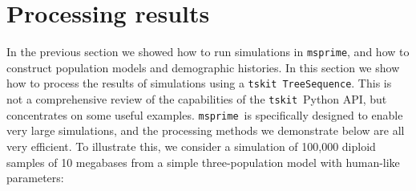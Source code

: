 \documentclass[graybox]{svmult}
\newcommand{\msprime}[0]{\texttt{msprime}}
\newcommand{\tskit}[0]{\texttt{tskit}}
\begin{document}








\section{Processing results}\label{processing-results}

In the previous section we showed how to run simulations in \msprime, and
how to construct population models and demographic histories. In this
section we show how to process the results of simulations using
a \tskit\ \texttt{TreeSequence}. This is not a
comprehensive review of the capabilities of the \tskit\ Python API, but
concentrates on some useful examples.
\msprime\ is specifically designed to enable very large simulations, and
the processing methods we demonstrate below are all very efficient. To
illustrate this, we consider a simulation of 100,000 diploid samples of 10 megabases
from a simple three-population model with human-like parameters:
\end{document}
